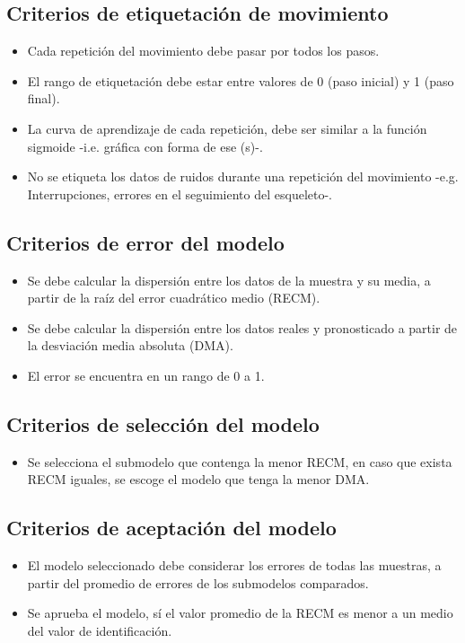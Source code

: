 \subsection{Criterios de etiquetaci\'on de movimiento}
\begin{itemize}
	\item Cada repetici\'on del movimiento debe pasar por todos los pasos.
	\item El rango de etiquetaci\'on debe estar entre valores de 0 (paso inicial) y 1 (paso final).
	\item La curva de aprendizaje de cada repetici\'on, debe ser similar a la funci\'on sigmoide -i.e. gr\'afica con forma de ese (s)-.
	\item No se etiqueta los datos de ruidos durante una repetici\'on del movimiento -e.g. Interrupciones, errores en el seguimiento del esqueleto-.
\end{itemize}
\subsection{Criterios de error del modelo}
\begin{itemize}
	\item Se debe calcular la dispersi\'on entre los datos de la muestra y su media, a partir de la ra\'iz del error cuadr\'atico medio (RECM).
	\item Se debe calcular la dispersi\'on entre los datos reales y pronosticado a partir de la desviaci\'on media absoluta (DMA). 
	\item El error se encuentra en un rango de 0 a 1.
\end{itemize}
\subsection{Criterios de selecci\'on del modelo}
\begin{itemize}
	\item Se selecciona el submodelo que contenga la  menor RECM, en caso que exista RECM iguales, se escoge el modelo que tenga la menor DMA.
\end{itemize}
\subsection{Criterios de aceptaci\'on del modelo}
\begin{itemize}
	\item El modelo seleccionado debe considerar los errores de todas las muestras, a partir del promedio de errores de los submodelos comparados.
	\item Se aprueba el modelo, s\'i el valor promedio de la RECM es menor a un medio del valor de  identificaci\'on.
\end{itemize}